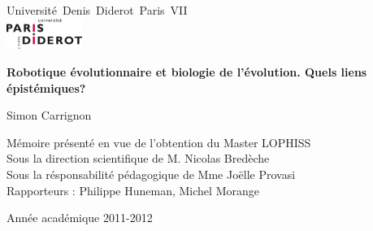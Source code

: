 \begin{titlepage}
\Large

\noindent Université~Denis~Diderot~Paris~VII\\
 
 \vfil
 \includegraphics[height=1cm]{images/logo_p7_large.jpg}
 
 \vfill
 
 
\begin{center}
 {\huge
\textbf{ 
	Robotique évolutionnaire et biologie de l'évolution. Quels liens épistémiques?
	}
 }
 \vfill
 
Simon Carrignon 
 

\vfill 
 
{
	\normalsize Mémoire présenté en vue de l'obtention du Master LOPHISS\\
}
{
	 \normalsize
	\vspace{.5cm}
	\noindent Sous la direction scientifique de M. Nicolas Bredèche\\ \noindent Sous la résponsabilité pédagogique de Mme Joëlle Provasi\\
% 

}
{	 
	\normalsize
	\vspace{.5cm}
	Rapporteurs : Philippe Huneman, Michel Morange\\
	\vfill
}
 
 {\small Année académique 2011-2012 }
\end{center}
\end{titlepage}

